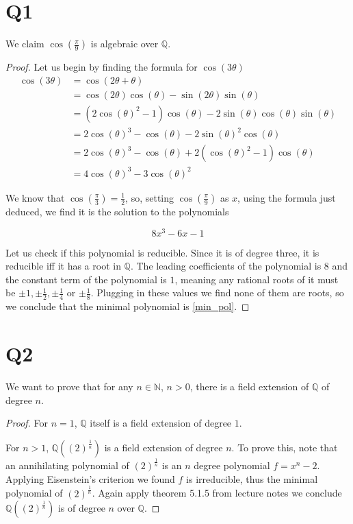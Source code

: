 \documentclass{article}
\date{\today}
\theoremstyle{definition}
\theoremstyle{definition}
\theoremstyle{remark}
\renewcommand{\c}{\cos(\theta)}
\newcommand{\s}{\sin(\theta)}
\newcommand{\bb}[1]{\mathbb{#1}} %
\begin{document}
\section{Q1}
We claim $\cos(\frac{ \pi}{9})$ is algebraic over $\bb{Q}$. 

\begin{proof}
	Let us begin by finding the formula for $\cos(3 \theta)$
	\begin{align*}
		\cos(3 \theta) 
		&= \cos(2 \theta + \theta) \\	
		&= \cos(2 \theta) \cos(\theta) - \sin(2 \theta) \sin(\theta) \\	
		&= (2\cos(\theta)^2 - 1) \c - 2\s\c\s \\
		&= 2 \c^3 - \c - 2\s^2 \c \\ 
		&= 2 \c^3 - \c + 2(\c^2 -1)\c \\
		&= 4 \c^3 - 3 \c ^2
	\end{align*}

	We know that $\cos(\frac{\pi}{3}) = \frac{1}{2}$, so, setting $\cos(\frac{\pi}{9}) $ as $x$, using the formula just deduced, we find it is the solution to the polynomials

	\begin{equation}\label{min_pol}
		8x^3 - 6x -1
	\end{equation}

	Let us check if this polynomial is reducible. 
	Since it is of degree three, it is reducible iff it has a root in $\bb{Q}$. 
	The leading coefficients of the polynomial is $8$ and the constant term of the polynomial is $1$, meaning any rational roots of it must be $\pm 1, \pm \frac{1}{2}, \pm \frac{1}{4}$ or $\pm \frac{1}{8}$. 
	Plugging in these values we find none of them are roots, so we conclude that the minimal polynomial is \ref{min_pol}.
\end{proof}

\section{Q2}

We want to prove that for any $n \in \bb{N}$, $n > 0$, there is a field extension of $\bb{Q}$ of degree $n$.

\begin{proof}
	For $n=1$, $\bb{Q}$ itself is a field extension of degree $1$.

	For $n > 1$, $\bb{Q}((2)^{\frac{1}{n}})$ is a field extension of degree $n$. 
	To prove this, note that an annihilating polynomial of $(2)^\frac{1}{n}$ is an $n$ degree polynomial $f =x^n - 2$. 
	Applying Eisenstein's criterion  we found $f$ is irreducible, thus the minimal polynomial of $(2)^{\frac{1}{n}}$.
	Again apply theorem 5.1.5 from lecture notes we conclude $\bb{Q}((2)^{\frac{1}{n}})$ is of degree $n$ over $\bb{Q}$.
\end{proof}
\end{document}
